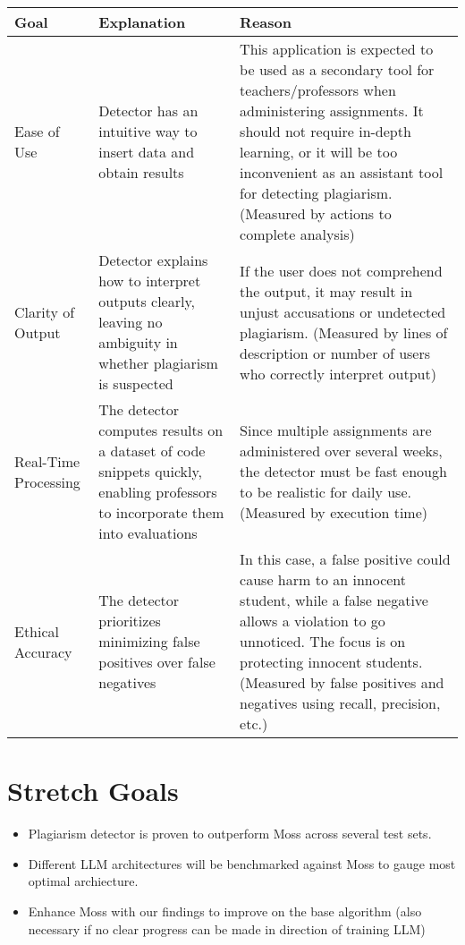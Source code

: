 \documentclass{article}
\begin{document}
\begin{center}
\hspace*{-1cm}
\begin{tabular}{ 
  | p{3cm} 
  | p{6cm} 
  | p{6cm} | }
\hline
Goal & 
Explanation & 
Reason \\
\hline
Ease of Use & 
Detector has an intuitive way to insert data and obtain results & 
This application is expected to be used as a secondary tool for teachers/professors when administering assignments. It should not require in-depth learning, or it will be too inconvenient as an assistant tool for detecting plagiarism. (Measured by actions to complete analysis)\\
\hline
Clarity of Output & 
Detector explains how to interpret outputs clearly, leaving no ambiguity in whether plagiarism is suspected & 
If the user does not comprehend the output, it may result in unjust accusations or undetected plagiarism. (Measured by lines of description or number of users who correctly interpret output)\\
\hline
Real-Time Processing & 
The detector computes results on a dataset of code snippets quickly, enabling professors to incorporate them into evaluations & 
Since multiple assignments are administered over several weeks, the detector must be fast enough to be realistic for daily use. (Measured by execution time)\\
\hline
Ethical Accuracy & 
The detector prioritizes minimizing false positives over false negatives & 
In this case, a false positive could cause harm to an innocent student, while a false negative allows a violation to go unnoticed. The focus is on protecting innocent students. (Measured by false positives and negatives using recall, precision, etc.)\\
\hline
\end{tabular}
\end{center}


 
\section{Stretch Goals}
\begin{itemize}
  \item Plagiarism detector is proven to outperform Moss across several test sets.
  \item Different LLM architectures will be benchmarked against Moss to gauge most optimal archiecture.
  \item Enhance Moss with our findings to improve on the base algorithm (also necessary if no clear progress can be made in direction of training LLM)
  
\end{itemize}
\end{document}
